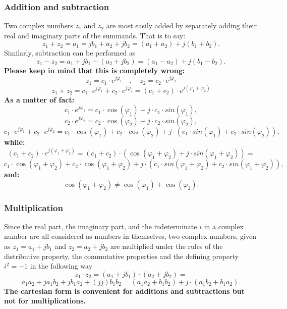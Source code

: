 \documentclass[12pt,oneside,openany]{memoir}
\numberwithin{equation}{subsection}
\begin{document}

\subsubsection{Addition and subtraction}
Two complex numbers \(z_1\) and \(z_2\) are most easily added by separately
adding their real and imaginary parts of the summands. That is to say:
\[
	z_1 + z_2 = a_1 = jb_1 + a_2 + jb_2 = (a_1 + a_2) + j(b_1 + b_2).
\]
Similarly, subtraction can be performed as
\[
	z_1 - z_2 = a_1 + jb_1 - (a_2 + jb_2) = (a_1 - a_2) +j(b_1 - b_2).
\]
\textbf{Please keep in mind that this is completely wrong:}
\[
	z_1 = c_1 \cdot e^{j \varphi_1} \quad , \quad z_2 = c_2
	\cdot e^{j \varphi_2}
\]
\[
	z_1 + z_2 = c_1 \cdot e^{j \varphi_1} + c_2 \cdot e^{j \varphi_2} =
	(c_1 + c_2) \cdot e^{j(\varphi_1 + \varphi_2)}
\]
\textbf{As a matter of fact:}
\[
	c_1 \cdot e^{j \varphi_1} = c_1 \cdot \cos(\varphi_1) + j \cdot
	c_1 \cdot sin(\varphi_1),
\]
\[
	c_2 \cdot e^{j \varphi_2} = c_2 \cdot \cos(\varphi_2) + j \cdot
	c_2 \cdot sin(\varphi_2),
\]
\[
	c_1 \cdot e^{j \varphi_1} + c_2 \cdot e^{j \varphi_2} = c_1 \cdot
	\cos(\varphi_1) + c_2 \cdot \cos(\varphi_2) + j \cdot
	(c_1 \cdot sin(\varphi_1) + c_2 \cdot sin(\varphi_2)),
\]
\textbf{while:}
\[
	(c_1 + c_2) \cdot e^{j (\varphi_1 + \varphi_2)} = (c_1 + c_2) \cdot
	(\cos(\varphi_1 + \varphi_2) + j \cdot sin(\varphi_1 + \varphi_2)) =
\]
\[
	c_1 \cdot \cos(\varphi_1 + \varphi_2) + c_2 \cdot
	\cos(\varphi_1 + \varphi_2) + j \cdot (c_1 \cdot
	sin(\varphi_1 + \varphi_2) + c_2 \cdot sin(\varphi_1 + \varphi_2)),
\]
\textbf{and:}
\[
	\cos(\varphi_1 + \varphi_2) \neq \cos(\varphi_1) + \cos(\varphi_2).
\]


\subsubsection{Multiplication}
Since the real part, the imaginary part, and the indeterminate \(i\) in a
complex number are all considered as numbers in themselves, two complex numbers,
given as \(z_1 = a_1 + j b_1\) and \(z_2 = a_2 + j b_2\) are multiplied under
the rules of the distributive property, the commutative properties and the
defining property \(i^{2} = -1\) in the following way
\[
	z_1 \cdot z_2 = (a_1 + j b_1) \cdot (a_2 + j b_2) =
\]
\[
	a_1 a_2 + j a_1 b_2 + j b_1 a_2 + (jj) b_1 b_2 = (a_1 a_2 + b_1 b_2) +
	j \cdot (a_1 b_2 + b_1 a_2).
\]
\textbf{The cartesian form is convenient for additions and subtractions but not
for multiplications.}
\end{document}
